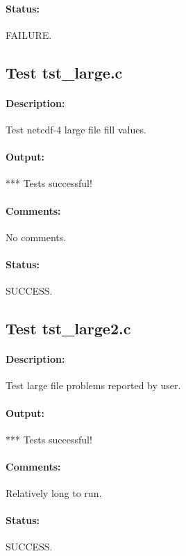 \paragraph{Status:} FAILURE.

\subsection{Test tst\_large.c}

\paragraph{Description:} Test netcdf-4 large file fill values.

\paragraph{Output:} *** Tests successful!

\paragraph{Comments:} No comments.

\paragraph{Status:} SUCCESS.

\subsection{Test tst\_large2.c}

\paragraph{Description:} Test large file problems reported by user.

\paragraph{Output:} *** Tests successful!

\paragraph{Comments:} Relatively long to run.

\paragraph{Status:} SUCCESS.

